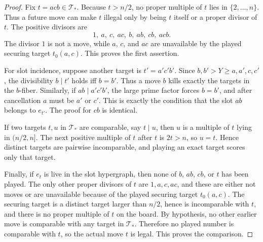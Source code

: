 \begin{proof}
Fix $t=acb\in\mathcal T_*$.  Because $t>n/2$, no proper multiple of $t$ lies in
$\{2,\dots,n\}$.  Thus a future move can make $t$ illegal only by being $t$
itself or a proper divisor of $t$.  The positive divisors are
\[
  1,\ a,\ c,\ ac,\ b,\ ab,\ cb,\ acb.
\]
The divisor $1$ is not a move, while $a$, $c$, and $ac$ are unavailable by
the played securing target $t_0(a,c)$.  This proves the first assertion.

For slot incidence, suppose another target is $t'=a'c'b'$.  Since
$b,b'>Y\ge a,a',c,c'$, the divisibility $b\mid t'$ holds iff $b=b'$.  Thus a
move $b$ kills exactly the targets in the $b$-fiber.  Similarly, if
$ab\mid a'c'b'$, the large prime factor forces $b=b'$, and after cancellation
$a$ must be $a'$ or $c'$.  This is exactly the condition that the slot $ab$
belongs to $e_{t'}$.  The proof for $cb$ is identical.

If two targets $t,u$ in $\mathcal T_*$ are comparable, say $t\mid u$, then
$u$ is a multiple of $t$ lying in $(n/2,n]$.  The next positive multiple of
$t$ after $t$ is $2t>n$, so $u=t$.  Hence distinct targets are pairwise
incomparable, and playing an exact target scores only that target.

Finally, if $e_t$ is live in the slot hypergraph, then none of $b$, $ab$, $cb$,
or $t$ has been played.  The only other proper divisors of $t$ are
$1,a,c,ac$, and these are either not moves or are unavailable because of the
played securing target $t_0(a,c)$.  The securing target is a distinct target
larger than $n/2$, hence is incomparable with $t$, and there is no proper
multiple of $t$ on the board.  By hypothesis, no other earlier move is
comparable with any target in $\mathcal T_*$.  Therefore no played number is
comparable with $t$, so the actual move $t$ is legal.  This proves the
comparison.
\end{proof}

